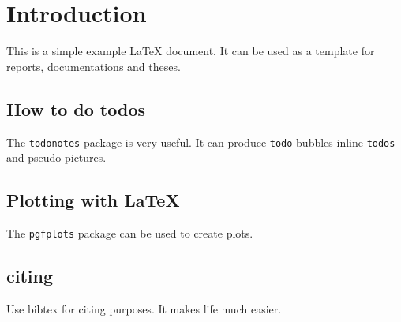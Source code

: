 \chapter{Introduction}\label{introduction}
This is a simple example \LaTeX{} document.
It can be used as a template for reports, documentations and theses.

\section{How to do todos}
The \verb+todonotes+ package is very useful.
It can produce \verb+todo+ bubbles  inline \verb+todos+  and pseudo pictures.

\section{Plotting with \LaTeX{}}
The \verb+pgfplots+ package can be used to create plots.
\begin{figure}

\end{figure}

\section{citing}
Use bibtex for citing \cite{Hairer1996} purposes.
It makes life much easier\cite{Kenwright2012}.
